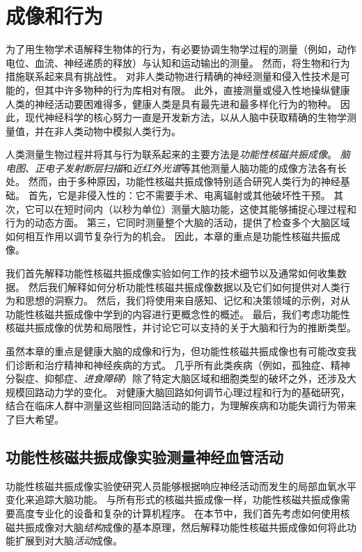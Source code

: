 \chapter{成像和行为} \label{chap:chap6}

为了用生物学术语解释生物体的行为，有必要协调生物学过程的测量（例如，动作电位、血流、神经递质的释放）与认知和运动输出的测量。
然而，将生物和行为措施联系起来具有挑战性。
对非人类动物进行精确的神经测量和侵入性技术是可能的，但其中许多物种的行为库相对有限。
此外，直接测量或侵入性地操纵健康人类的神经活动要困难得多，健康人类是具有最先进和最多样化行为的物种。
因此，现代神经科学的核心努力一直是开发新方法，以从人脑中获取精确的生物学测量值，并在非人类动物中模拟人类行为。


人类测量生物过程并将其与行为联系起来的主要方法是\textit{功能性核磁共振成像}。
\textit{脑电图}、\textit{正电子发射断层扫描}和\textit{近红外光谱}等其他测量人脑功能的成像方法各有长处。
然而，由于多种原因，功能性核磁共振成像特别适合研究人类行为的神经基础。
首先，它是非侵入性的：它不需要手术、电离辐射或其他破坏性干预。
其次，它可以在短时间内（以秒为单位）测量大脑功能，这使其能够捕捉心理过程和行为的动态方面。
第三，它同时测量整个大脑的活动，提供了检查多个大脑区域如何相互作用以调节复杂行为的机会。
因此，本章的重点是功能性核磁共振成像。


我们首先解释功能性核磁共振成像实验如何工作的技术细节以及通常如何收集数据。 
然后我们解释如何分析功能性核磁共振成像数据以及它们如何提供对人类行为和思想的洞察力。 
然后，我们将使用来自感知、记忆和决策领域的示例，对从功能性核磁共振成像中学到的内容进行更概念性的概述。
最后，我们考虑功能性核磁共振成像的优势和局限性，并讨论它可以支持的关于大脑和行为的推断类型。


虽然本章的重点是健康大脑的成像和行为，但功能性核磁共振成像也有可能改变我们诊断和治疗精神和神经疾病的方式。
几乎所有此类疾病（例如，孤独症、精神分裂症、抑郁症、\textit{进食障碍}）除了特定大脑区域和细胞类型的破坏之外，还涉及大规模回路动力学的变化。
对健康大脑回路如何调节心理过程和行为的基础研究，结合在临床人群中测量这些相同回路活动的能力，为理解疾病和功能失调行为带来了巨大希望。



\section{功能性核磁共振成像实验测量神经血管活动}

功能性核磁共振成像实验使研究人员能够根据响应神经活动而发生的局部血氧水平变化来追踪大脑功能。
与所有形式的核磁共振成像一样，功能性核磁共振成像需要高度专业化的设备和复杂的计算机程序。
在本节中，我们首先考虑如何使用核磁共振成像对大脑\textit{结构}成像的基本原理，然后解释功能性核磁共振成像如何将此功能扩展到对大脑\textit{活动}成像。


